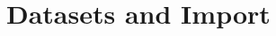 \documentclass[a4paper,10pt,twoside]{book}
\begin{document}
\fi
\sloppy

\chapter{Datasets and Import}


\ifx\wholebook\relax\else
   
\end{document}
